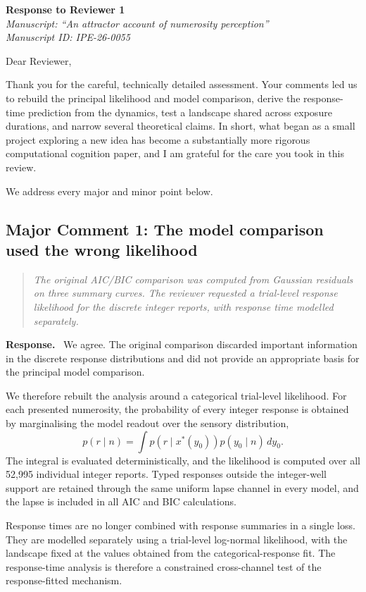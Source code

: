 \documentclass[11pt]{article}
\newenvironment{reviewercomment}{\begin{quote}\color{reviewgray}\itshape}{\end{quote}}
\newenvironment{authorresponse}{\par\noindent\textbf{\color{responseblue}Response.}\ }{\par}
\begin{document}
\begin{center}
{\Large\bfseries Response to Reviewer 1}\\[0.5em]
{\itshape Manuscript: ``An attractor account of numerosity perception''}\\[0.25em]
{\itshape Manuscript ID: IPE-26-0055}
\end{center}

Dear Reviewer,

Thank you for the careful, technically detailed assessment. Your comments led us to rebuild the principal likelihood and model comparison, derive the response-time prediction from the dynamics, test a landscape shared across exposure durations, and narrow several theoretical claims. In short, what began as a small project exploring a new idea has become a substantially more rigorous computational cognition paper, and I am grateful for the care you took in this review.

We address every major and minor point below.

\subsection*{Major Comment 1: The model comparison used the wrong likelihood}

\begin{reviewercomment}
The original AIC/BIC comparison was computed from Gaussian residuals on three summary curves. The reviewer requested a trial-level response likelihood for the discrete integer reports, with response time modelled separately.
\end{reviewercomment}

\begin{authorresponse}
We agree. The original comparison discarded important information in the discrete response distributions and did not provide an appropriate basis for the principal model comparison.

We therefore rebuilt the analysis around a categorical trial-level likelihood. For each presented numerosity, the probability of every integer response is obtained by marginalising the model readout over the sensory distribution,
\[
p(r\mid n)=\int p\!\left(r\mid x^*(y_0)\right)p(y_0\mid n)\,dy_0.
\]
The integral is evaluated deterministically, and the likelihood is computed over all 52,995 individual integer reports. Typed responses outside the integer-well support are retained through the same uniform lapse channel in every model, and the lapse is included in all AIC and BIC calculations.

Response times are no longer combined with response summaries in a single loss. They are modelled separately using a trial-level log-normal likelihood, with the landscape fixed at the values obtained from the categorical-response fit. The response-time analysis is therefore a constrained cross-channel test of the response-fitted mechanism.
\end{authorresponse}
\end{document}
